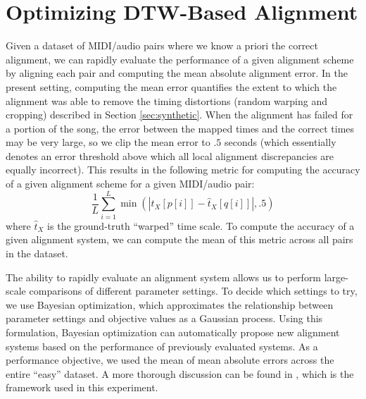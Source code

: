 \documentclass{article}
\begin{document}
\section{Optimizing DTW-Based Alignment}
\label{sec:optimizing}

Given a dataset of MIDI/audio pairs where we know a priori the correct alignment, we can rapidly evaluate the performance of a given alignment scheme by aligning each pair and computing the mean absolute alignment error.
In the present setting, computing the mean error quantifies the extent to which the alignment was able to remove the timing distortions (random warping and cropping) described in Section \ref{sec:synthetic}.
When the alignment has failed for a portion of the song, the error between the mapped times and the correct times may be very large, so we clip the mean error to $.5$ seconds (which essentially denotes an error threshold above which all local alignment discrepancies are equally incorrect).
This results in the following metric for computing the accuracy of a given alignment scheme for a given MIDI/audio pair:
$$
\frac{1}{L}\sum_{i = 1}^{L} \min(|t_X[p[i]] - \hat{t}_X[q[i]]|, .5)
$$
where $\hat{t}_X$ is the ground-truth ``warped'' time scale.
To compute the accuracy of a given alignment system, we can compute the mean of this metric across all pairs in the dataset.

The ability to rapidly evaluate an alignment system allows us to perform large-scale comparisons of different parameter settings.
To decide which settings to try, we use Bayesian optimization, which approximates the relationship between parameter settings and objective values as a Gaussian process.
Using this formulation, Bayesian optimization can automatically propose new alignment systems based on the performance of previously evaluated systems.
As a performance objective, we used the mean of mean absolute errors across the entire ``easy'' dataset.
A more thorough discussion can be found in \cite{snoek2012practical}, which is the framework used in this experiment.
\end{document}
